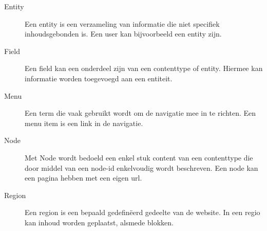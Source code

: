 \begin{description}
\item[Entity] Een entity is een verzameling van informatie die niet specifiek inhoudsgebonden is. Een user kan bijvoorbeeld een entity zijn. 

\item[Field] Een field kan een onderdeel zijn van een contenttype of entity. Hiermee kan informatie worden toegevoegd aan een entiteit. 

\item[Menu] Een term die vaak gebruikt wordt om de navigatie mee in te richten. Een menu item is een link in de navigatie. 

\item[Node] Met Node wordt bedoeld een enkel stuk content van een contenttype die door middel van een node-id enkelvoudig wordt beschreven. Een node kan een pagina hebben met een eigen url. 

\item[Region] Een region is een bepaald gedefin\"eerd gedeelte van de website. In een regio kan inhoud worden geplaatst, alsmede blokken.

\end{description}
